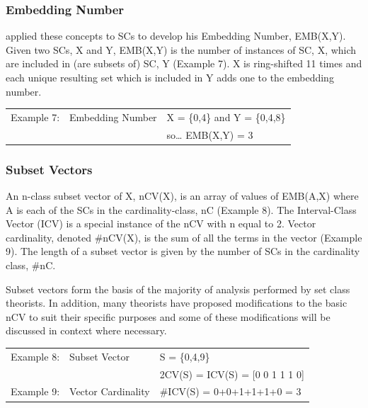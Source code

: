 \documentclass{article}
\begin{document}
\subsubsection{Embedding Number}
\label{sec-3-3-2}

\citet{Lewin1979} applied these concepts to SCs to develop his
Embedding Number, EMB(X,Y). Given two SCs, X and Y, EMB(X,Y) is the
number of instances of SC, X, which are included in (are subsets of)
SC, Y (Example 7). X is ring-shifted 11 times and each unique
resulting set which is included in Y adds one to the embedding number.

\begin{center}
\begin{tabular}{lll}
 Example 7:  &  Embedding Number  &  X = \{0,4\} and Y = \{0,4,8\}  \\
             &                    &  so\ldots{} EMB(X,Y) = 3        \\
\end{tabular}
\end{center}
\subsubsection{Subset Vectors}
\label{sec-3-3-3}

An n-class subset vector of X, nCV(X), is an array of values of
EMB(A,X) where A is each of the SCs in the cardinality-class, nC
(Example 8). The Interval-Class Vector (ICV) is a special instance of
the nCV with n equal to 2. Vector cardinality, denoted \#nCV(X), is the
sum of all the terms in the vector (Example 9). The length of a subset
vector is given by the number of SCs in the cardinality class, \#nC.

Subset vectors form the basis of the majority of analysis performed by
set class theorists. In addition, many theorists have proposed
modifications to the basic nCV to suit their specific purposes and
some of these modifications will be discussed in context where
necessary.


\begin{center}
\begin{tabular}{lll}
 Example 8:  &  Subset Vector       &  S = \{0,4,9\}                    \\
             &                      &  2CV(S) = ICV(S) = [0 0 1 1 1 0]  \\
 Example 9:  &  Vector Cardinality  &  \#ICV(S) = 0+0+1+1+1+0 = 3       \\
\end{tabular}
\end{center}
\end{document}
